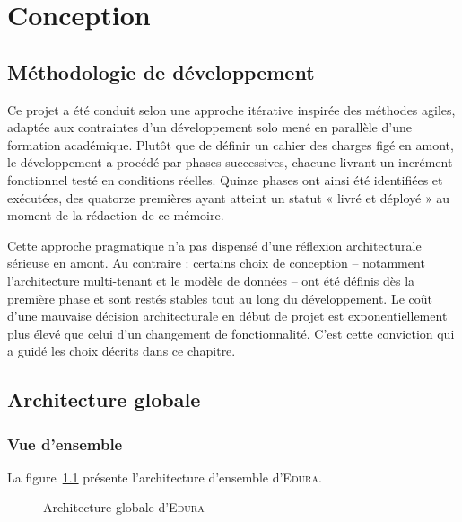 \documentclass[12pt,a4paper,oneside]{report}
\newcommand{\edura}{\textsc{Edura}}
\begin{document}
\chapter{Conception}

\section{Méthodologie de développement}

Ce projet a été conduit selon une approche itérative inspirée des méthodes agiles, adaptée aux contraintes d'un développement solo mené en parallèle d'une formation académique. Plutôt que de définir un cahier des charges figé en amont, le développement a procédé par phases successives, chacune livrant un incrément fonctionnel testé en conditions réelles. Quinze phases ont ainsi été identifiées et exécutées, des quatorze premières ayant atteint un statut « livré et déployé » au moment de la rédaction de ce mémoire.

Cette approche pragmatique n'a pas dispensé d'une réflexion architecturale sérieuse en amont. Au contraire : certains choix de conception -- notamment l'architecture multi-tenant et le modèle de données -- ont été définis dès la première phase et sont restés stables tout au long du développement. Le coût d'une mauvaise décision architecturale en début de projet est exponentiellement plus élevé que celui d'un changement de fonctionnalité. C'est cette conviction qui a guidé les choix décrits dans ce chapitre.

\section{Architecture globale}

\subsection{Vue d'ensemble}

La figure~\ref{fig:architecture_globale} présente l'architecture d'ensemble d'\edura{}.

\begin{figure}[H]
\centering
\caption{Architecture globale d'\edura{}}
\label{fig:architecture_globale}
\end{figure}
\end{document}
